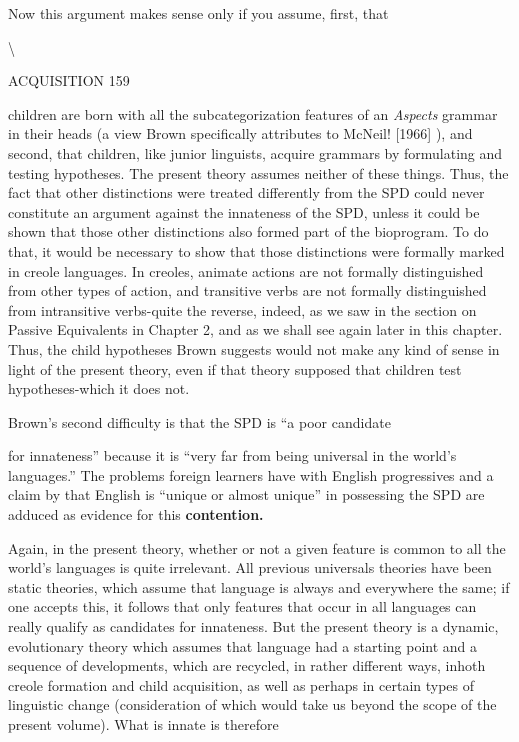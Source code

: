 Now this argument makes sense only if you assume, first, that

{\textbackslash}

ACQUISITION 159

children are born with all the subcategorization features of an \textit{Aspects} grammar in their heads (a view Brown specifically attributes to McNeil! [1966] ), and second, that children, like junior linguists, acquire gram\-mars by formulating and testing hypotheses. The present theory as\-sumes neither of these things. Thus, the fact that other distinctions were treated differently from the SPD could never constitute an argu\-ment against the innateness of the SPD, unless it could be shown that those other distinctions also formed part of the bioprogram. To do that, it would be necessary to show that those distinctions were for\-mally marked in creole languages. In creoles, animate actions are not formally distinguished from other types of action, and transitive verbs are not formally distinguished from intransitive verbs-quite the reverse, indeed, as we saw in the section on Passive Equivalents in Chapter 2, and as we shall see again later in this chapter. Thus, the child hy\-potheses Brown suggests would not make any kind of sense in light of the present theory, even if that theory supposed that children test hypotheses-which it does not.

Brown's second difficulty is that the SPD is ``a poor candidate

for innateness'' because it is ``very far from being universal in the world's languages.'' The problems foreign learners have with English progressives and a claim by \citet{Joos1964} that English is ``unique or almost unique'' in possessing the SPD are adduced as evidence for this \textbf{contention.}

Again, in the present theory, whether or not a given feature is common to all the world's languages is quite irrelevant. All previous universals theories have been static theories, which assume that lan\-guage is always and everywhere the same; if one accepts this, it follows that only features that occur in all languages can really qualify as can\-didates for innateness. But the present theory is a dynamic, evolu\-tionary theory which assumes that language had a starting point and a sequence of developments, which are recycled, in rather different ways, inhoth creole formation and child acquisition, as well as perhaps in certain types of linguistic change (consideration of which would take us beyond the scope of the present volume). What is innate is therefore

